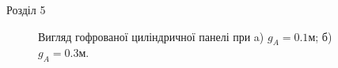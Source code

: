 \documentclass[handout, 8pt]{beamer}
\numberwithin{figure}{section}
\numberwithin{equation}{section}
\numberwithin{table}{section}
\begin{document}
\begin{frame}{Розділ 5}
\begin{figure}[h]
\begin{minipage}[h]{0.49\linewidth}
\end{minipage}
\hfill
\begin{minipage}[h]{0.49\linewidth}
\end{minipage}
\caption{Вигляд гофрованої циліндричної панелі при a) $g_A = 0.1м$; б) $g_A = 0.3м$.}
\end{figure}
\end{frame}
\end{document}

